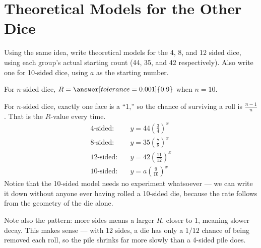 \documentclass[12pt]{ximera}
\begin{document}
\section*{Theoretical Models for the Other Dice}

\begin{problem}
Using the same idea, write theoretical models for the 4, 8, and 12 sided dice, using each
group's actual starting count (44, 35, and 42 respectively). Also write one for 10-sided
dice, using $a$ as the starting number.

For $n$-sided dice, $R = \answer[tolerance=0.001]{0.9}$ when $n = 10$.

\begin{freeResponse}
\end{freeResponse}

\begin{solution}
For $n$-sided dice, exactly one face is a ``1,'' so the chance of surviving a roll is
$\tfrac{n-1}{n}$. That is the $R$-value every time.
\begin{align*}
\text{4-sided:} \quad & y = 44\left(\tfrac{3}{4}\right)^x \\
\text{8-sided:} \quad & y = 35\left(\tfrac{7}{8}\right)^x \\
\text{12-sided:} \quad & y = 42\left(\tfrac{11}{12}\right)^x \\
\text{10-sided:} \quad & y = a\left(\tfrac{9}{10}\right)^x
\end{align*}
Notice that the 10-sided model needs no experiment whatsoever --- we can write it down
without anyone ever having rolled a 10-sided die, because the rate follows from the
geometry of the die alone.

Note also the pattern: more sides means a larger $R$, closer to 1, meaning slower decay.
This makes sense --- with 12 sides, a die has only a $1/12$ chance of being removed each
roll, so the pile shrinks far more slowly than a 4-sided pile does.
\end{solution}
\end{problem}
\end{document}
